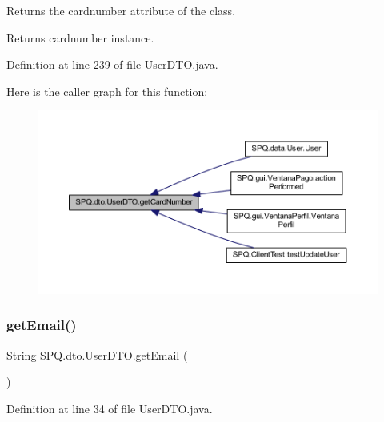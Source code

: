 Returns the cardnumber attribute of the class. \begin{DoxyReturn}{Returns}
cardnumber instance. 
\end{DoxyReturn}


Definition at line 239 of file User\+D\+T\+O.\+java.

Here is the caller graph for this function\+:\nopagebreak
\begin{figure}[H]
\begin{center}
\leavevmode
\includegraphics[width=350pt]{class_s_p_q_1_1dto_1_1_user_d_t_o_a6ffd8dce998a3e1756aa82e7b2981dd4_icgraph}
\end{center}
\end{figure}
\mbox{\label{class_s_p_q_1_1dto_1_1_user_d_t_o_a67038ab8bab7cb7119ece00bcb20a360}} 
\subsubsection{\texorpdfstring{get\+Email()}{getEmail()}\hspace{0.1cm}{\footnotesize\ttfamily [1/3]}}
{\footnotesize\ttfamily String S\+P\+Q.\+dto.\+User\+D\+T\+O.\+get\+Email (\begin{DoxyParamCaption}{ }\end{DoxyParamCaption})}



Definition at line 34 of file User\+D\+T\+O.\+java.

\mbox{\label{class_s_p_q_1_1dto_1_1_user_d_t_o_a67038ab8bab7cb7119ece00bcb20a360}} 
